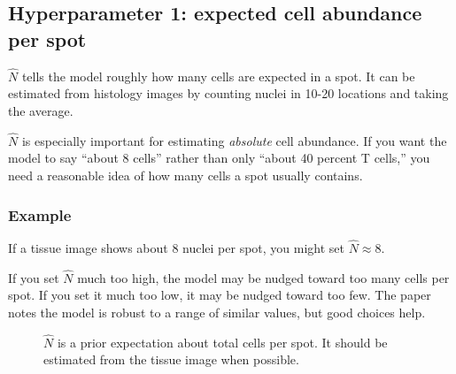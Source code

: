 \documentclass[11pt]{article}
\begin{document}
\subsection{Hyperparameter 1: expected cell abundance per spot}

$\hat N$ tells the model roughly how many cells are expected in a spot. It can be estimated from histology images by counting nuclei in 10-20 locations and taking the average.

\begin{bigidea}
$\hat N$ is especially important for estimating \emph{absolute} cell abundance. If you want the model to say ``about 8 cells'' rather than only ``about 40 percent T cells,'' you need a reasonable idea of how many cells a spot usually contains.
\end{bigidea}

\subsubsection{Example}

If a tissue image shows about 8 nuclei per spot, you might set $\hat N\approx 8$.

If you set $\hat N$ much too high, the model may be nudged toward too many cells per spot. If you set it much too low, it may be nudged toward too few. The paper notes the model is robust to a range of similar values, but good choices help.

\begin{figure}[H]
\centering
{}
\caption{$\hat N$ is a prior expectation about total cells per spot. It should be estimated from the tissue image when possible.}
\end{figure}
\end{document}
